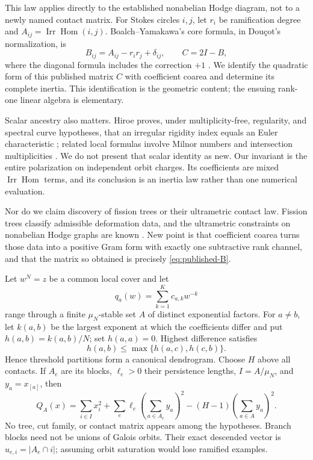 \documentclass[11pt,a4paper]{amsart}
\theoremstyle{plain}
\theoremstyle{definition}
\newcommand{\Irr}{\operatorname{Irr}}
\newcommand{\Hom}{\operatorname{Hom}}
\begin{document}
This law applies directly to the established nonabelian Hodge diagram, not to a newly named
contact matrix.  For Stokes circles $i,j$, let $r_i$ be ramification degree and
$A_{ij}=\Irr\Hom(i,j)$.  Boalch--Yamakawa's core formula, in Dou\c{c}ot's normalization, is
\begin{equation}\label{eq:published-B}
 B_{ij}=A_{ij}-r_ir_j+\delta_{ij},\qquad C=2I-B,
\end{equation}
where the diagonal formula includes the correction $+1$
\cite{BoalchYamakawa2020,Doucot2021}.  We identify the quadratic form of this published matrix
$C$ with coefficient coarea and determine its complete inertia.  This identification is the
geometric content; the ensuing rank-one linear algebra is elementary.

Scalar ancestry also matters.  Hiroe proves, under multiplicity-free, regularity, and spectral
curve hypotheses, that an irregular rigidity index equals an Euler characteristic
\cite{Hiroe2019}; related local formulas involve Milnor numbers and intersection multiplicities
\cite{Hiroe2017}.  We do not present that scalar identity as new.  Our invariant is the entire
polarization on independent orbit charges.  Its coefficients are mixed $\Irr\Hom$ terms, and its
conclusion is an inertia law rather than one numerical evaluation.

Nor do we claim discovery of fission trees or their ultrametric contact law.  Fission trees classify
admissible deformation data, and the ultrametric constraints on nonabelian Hodge graphs are known
\cite{Boalch2025,Doucot2025}.  New point is that coefficient coarea turns those data into a
positive Gram form with exactly one subtractive rank channel, and that the matrix so obtained is
precisely \eqref{eq:published-B}.

Let $w^N=z$ be a common local cover and let
\[
                         q_a(w)=\sum_{k=1}^{K}c_{a,k}w^{-k}
\]
range through a finite $\mu_N$-stable set $A$ of distinct exponential factors.  For $a\ne b$,
let $k(a,b)$ be the largest exponent at which the coefficients differ and put
$h(a,b)=k(a,b)/N$; set $h(a,a)=0$.  Highest difference satisfies
\[
                         h(a,b)\leq\max\{h(a,c),h(c,b)\}.
\]
Hence threshold partitions form a canonical dendrogram.  Choose $H$ above all contacts.  If
$A_e$ are its blocks, $\ell_e>0$ their persistence lengths, $I=A/\mu_N$, and $y_a=x_{[a]}$, then
\begin{equation}\label{eq:intro-law}
 \boxed{Q_A(x)=\sum_{i\in I}x_i^2+
        \sum_e\ell_e\left(\sum_{a\in A_e}y_a\right)^2
        -(H-1)\left(\sum_{a\in A}y_a\right)^2.}
\end{equation}
No tree, cut family, or contact matrix appears among the hypotheses.  Branch blocks need not be
unions of Galois orbits.  Their exact descended vector is
$u_{e,i}=|A_e\cap i|$; assuming orbit saturation would lose ramified examples.
\end{document}
